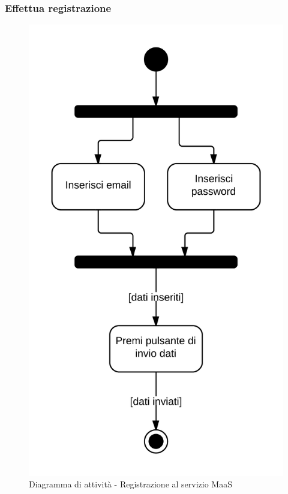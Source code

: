 \subsubsection{Effettua registrazione}

\begin{figure}[H]
\centering
\includegraphics[scale=0.1]{uml/MaaP - Effettua registrazione.png}
\caption{Diagramma di attività - Registrazione al servizio MaaS}
\end{figure}

